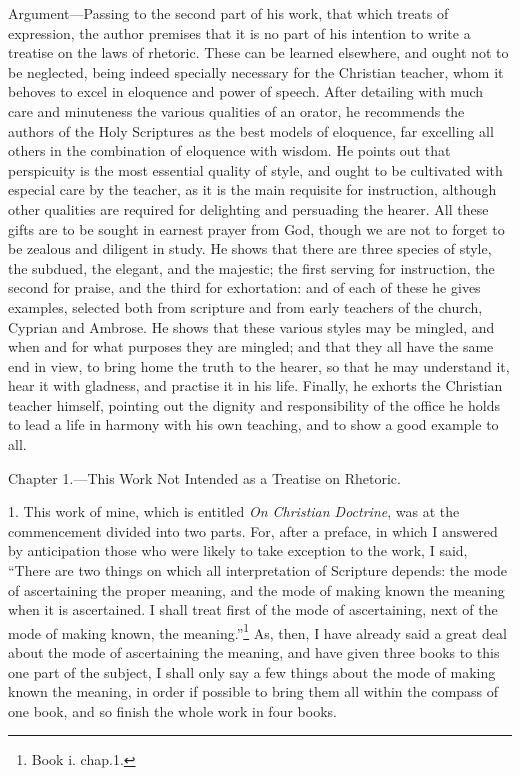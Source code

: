 Argument—Passing to the second part of his work, that which treats of expression, the author premises that it is no part of his intention to write a treatise on the laws of rhetoric. These can be learned elsewhere, and ought not to be neglected, being indeed specially necessary for the Christian teacher, whom it behoves to excel in eloquence and power of speech. After detailing with much care and minuteness the various qualities of an orator, he recommends the authors of the Holy Scriptures as the best models of eloquence, far excelling all others in the combination of eloquence with wisdom. He points out that perspicuity is the most essential quality of style, and ought to be cultivated with especial care by the teacher, as it is the main requisite for instruction, although other qualities are required for delighting and persuading the hearer. All these gifts are to be sought in earnest prayer from God, though we are not to forget to be zealous and diligent in study. He shows that there are three species of style, the subdued, the elegant, and the majestic; the first serving for instruction, the second for praise, and the third for exhortation: and of each of these he gives examples, selected both from scripture and from early teachers of the church, Cyprian and Ambrose. He shows that these various styles may be mingled, and when and for what purposes they are mingled; and that they all have the same end in view, to bring home the truth to the hearer, so that he may understand it, hear it with gladness, and practise it in his life. Finally, he exhorts the Christian teacher himself, pointing out the dignity and responsibility of the office he holds to lead a life in harmony with his own teaching, and to show a good example to all.


Chapter 1.—This Work Not Intended as a Treatise on Rhetoric.

1. This work of mine, which is entitled \emph{On Christian Doctrine}, was at the commencement divided into two parts. For, after a preface, in which I answered by anticipation those who were likely to take exception to the work, I said, “There are two things on which all interpretation of Scripture depends: the mode of ascertaining the proper meaning, and the mode of making known the meaning when it is ascertained. I shall treat first of the mode of ascertaining, next of the mode of making known, the meaning.”\footnote{Book i. chap.1.} As, then, I have already said a great deal about the mode of ascertaining the meaning, and have given three books to this one part of the subject, I shall only say a few things about the mode of making known the meaning, in order if possible to bring them all within the compass of one book, and so finish the whole work in four books.

